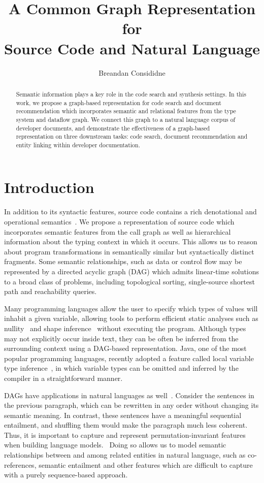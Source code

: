 \documentclass{article}
\title{A Common Graph Representation for\\Source Code and Natural Language}
\author{Breandan Consididne}
\begin{document}
\maketitle

\begin{abstract}
Semantic information plays a key role in the code search and synthesis settings. In this work, we propose a graph-based representation for code search and document recommendation which incorporates semantic and relational features from the type system and dataflow graph. We connect this graph to a natural language corpus of developer documents, and demonstrate the effectiveness of a graph-based representation on three downstream tasks: code search, document recommendation and entity linking within developer documentation.
\end{abstract}

\section{Introduction}

In addition to its syntactic features, source code contains a rich denotational and operational semantics~\citep{henkel2018code}. We propose a representation of source code which incorporates semantic features from the call graph as well as hierarchical information about the typing context in which it occurs. This allows us to reason about program transformations in semantically similar but syntactically distinct fragments. Some semantic relationships, such as data or control flow may be represented by a directed acyclic graph (DAG) which admits linear-time solutions to a broad class of problems, including topological sorting, single-source shortest path and reachability queries.

Many programming languages allow the user to specify which types of values will inhabit a given variable, allowing tools to perform efficient static analyses such as nullity~\citep{ekman2007pluggable} and shape inference~\citep{considine2019kotlingrad} without executing the program. Although types may not explicitly occur inside text, they can be often be inferred from the surrounding context using a DAG-based representation. Java, one of the most popular programming languages, recently adopted a feature called local variable type inference~\citet{liddell2019analyzing}, in which variable types can be omitted and inferred by the compiler in a straightforward manner.

DAGs have applications in natural languages as well~\citep{sagae2008shift, quernheim2012dagger}. Consider the sentences in the previous paragraph, which can be rewritten in any order without changing its semantic meaning. In contrast, these sentences have a meaningful sequential entailment, and shuffling them would make the paragraph much less coherent. Thus, it is important to capture and represent permutation-invariant features when building language models.~\citep{vinyals2015pointer} Doing so allows us to model semantic relationships between and among related entities in natural language, such as co-references, semantic entailment and other features which are difficult to capture with a purely sequence-based approach.
\end{document}
